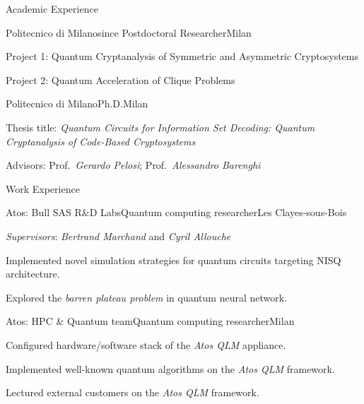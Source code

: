 \documentclass[
	a4paper, %
	10pt, %
]{tresume} %
\begin{document}
\begin{tSection}{Academic Experience}
  \begin{tSubsection}{Politecnico di Milano}{since }{Postdoctoral Researcher}{Milan}
  \item Project 1: Quantum Cryptanalysis of Symmetric and Asymmetric Cryptosystems
  \item Project 2: Quantum Acceleration of Clique Problems
  \end{tSubsection}
  \begin{tSubsection}{Politecnico di Milano}{}{Ph.D.}{Milan}
  \item Thesis title: \emph{Quantum Circuits for Information Set Decoding: Quantum Cryptanalysis of Code-Based Cryptosystems}
  \item Advisors: Prof.\ \emph{Gerardo Pelosi}; Prof.\ \emph{Alessandro Barenghi}
  \end{tSubsection}
\end{tSection}
\begin{tSection}{Work Experience}
  \begin{tSubsection}{Atos: Bull SAS R\&D Labs}{\origdate{}}{Quantum computing researcher}{Les Clayes-sous-Bois}
  \item \emph{Supervisors}: \emph{Bertrand Marchand} and \emph{Cyril Allouche}
  \item Implemented novel simulation strategies for quantum circuits targeting
    NISQ architecture.
  \item Explored the \emph{barren plateau problem} in quantum neural network.
  \end{tSubsection}

  \begin{tSubsection}{Atos: HPC \& Quantum team}{\origdate{}}{Quantum computing researcher}{Milan}
  \item Configured hardware/software stack of the \textit{Atos QLM} appliance.
  \item Implemented well-known quantum algorithms on the \textit{Atos QLM} framework.
  \item Lectured external customers on the \textit{Atos QLM} framework.
\end{tSubsection}
\end{tSection}
\end{document}
